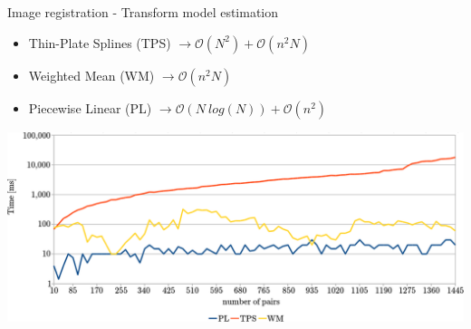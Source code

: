 \begin{frame}{Image registration - Transform model estimation}
  \begin{itemize}
    \scriptsize
    \item Thin-Plate Splines (TPS) \citep{harder1972interpolation} $\rightarrow \mathcal{O}(N^2) + \mathcal{O}(n^2N)$
    \item Weighted Mean (WM) \citep{goshtasby1993design} $\rightarrow \mathcal{O}(n^2N)$
    \item Piecewise Linear (PL) \citep{goshtasby1986piecewise} $\rightarrow \mathcal{O}(N~log(N)) + \mathcal{O}(n^2)$
  \end{itemize}

  \begin{center}
    \includegraphics[width=\textwidth]{compTransf}
  \end{center}

  \note {
  
  }
\end{frame}

